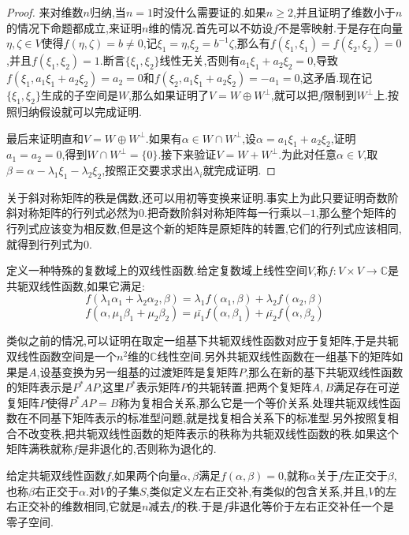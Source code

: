\begin{proof}
	
	来对维数$n$归纳,当$n=1$时没什么需要证的.如果$n\ge2$,并且证明了维数小于$n$的情况下命题都成立,来证明$n$维的情况.首先可以不妨设$f$不是零映射.于是存在向量$\eta,\zeta\in V$使得$f(\eta,\zeta)=b\not=0$,记$\xi_1=\eta$,$\xi_2=b^{-1}\zeta$,那么有$f(\xi_1,\xi_1)=f(\xi_2,\xi_2)=0$,并且$f(\xi_1,\xi_2)=1$.断言$\{\xi_1,\xi_2\}$线性无关,否则有$a_1\xi_1+a_2\xi_2=0$,导致$f(\xi_1,a_1\xi_1+a_2\xi_2)=a_2=0$和$f(\xi_2,a_1\xi_1+a_2\xi_2)=-a_1=0$,这矛盾.现在记$\{\xi_1,\xi_2\}$生成的子空间是$W$,那么如果证明了$V=W\oplus W^{\perp}$,就可以把$f$限制到$W^{\perp}$上.按照归纳假设就可以完成证明.
	
	最后来证明直和$V=W\oplus W^{\perp}$.如果有$\alpha\in W\cap W^{\perp}$,设$\alpha=a_1\xi_1+a_2\xi_2$,证明$a_1=a_2=0$,得到$W\cap W^{\perp}=\{0\}$.接下来验证$V=W+W^{\perp}$.为此对任意$\alpha\in V$,取$\beta=\alpha-\lambda_1\xi_1-\lambda_2\xi_2$,按照正交要求求出$\lambda_i$就完成证明.
	
\end{proof}

关于斜对称矩阵的秩是偶数,还可以用初等变换来证明.事实上为此只要证明奇数阶斜对称矩阵的行列式必然为0.把奇数阶斜对称矩阵每一行乘以$-1$,那么整个矩阵的行列式应该变为相反数,但是这个新的矩阵是原矩阵的转置,它们的行列式应该相同,就得到行列式为0.

定义一种特殊的复数域上的双线性函数.给定复数域上线性空间$V$,称$f:V\times V\to\mathbb{C}$是共轭双线性函数,如果它满足:
$$f(\lambda_1\alpha_1+\lambda_2\alpha_2,\beta)=\lambda_1f(\alpha_1,\beta)+\lambda_2f(\alpha_2,\beta)$$
$$f(\alpha,\mu_1\beta_1+\mu_2\beta_2)=\overline{\mu_1}f(\alpha,\beta_1)+\overline{\mu_2}f(\alpha,\beta_2)$$

类似之前的情况,可以证明在取定一组基下共轭双线性函数对应于复矩阵,于是共轭双线性函数空间是一个$n^2$维的$\mathbb{C}$线性空间.另外共轭双线性函数在一组基下的矩阵如果是$A$,设基变换为另一组基的过渡矩阵是复矩阵$P$,那么在新的基下共轭双线性函数的矩阵表示是$P^*AP$,这里$P^*$表示矩阵$P$的共轭转置.把两个复矩阵$A,B$满足存在可逆复矩阵$P$使得$P^*AP=B$称为复相合关系,那么它是一个等价关系.处理共轭双线性函数在不同基下矩阵表示的标准型问题,就是找复相合关系下的标准型.另外按照复相合不改变秩,把共轭双线性函数的矩阵表示的秩称为共轭双线性函数的秩.如果这个矩阵满秩就称$f$是非退化的,否则称为退化的.

给定共轭双线性函数$f$,如果两个向量$\alpha,\beta$满足$f(\alpha,\beta)=0$,就称$\alpha$关于$f$左正交于$\beta$,也称$\beta$右正交于$\alpha$.对$V$的子集$S$,类似定义左右正交补,有类似的包含关系,并且,$V$的左右正交补的维数相同,它就是$n$减去$f$的秩.于是$f$非退化等价于左右正交补任一个是零子空间.


